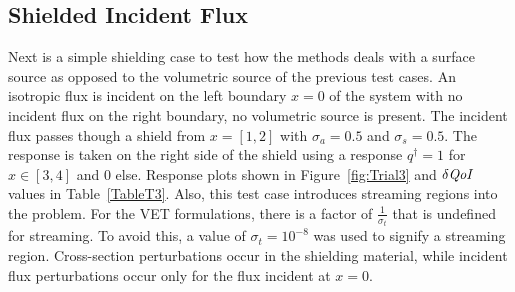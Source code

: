 \documentclass[12pt]{report}
\newcommand{\sigt}{\sigma_t}
\newcommand{\sigs}{\sigma_s}
\newcommand{\siga}{\sigma_a}
\newcommand{\qoi}{{\it QoI}\xspace}
\begin{document}
\subsection{Shielded Incident Flux}

Next is a simple shielding case to test how the methods deals with a surface source as opposed to the volumetric source of the previous test cases. An isotropic flux is incident on the left boundary $x=0$ of the system with no incident flux on the right boundary, no volumetric source is present. The incident flux passes though a shield from $x=[1,2]$ with $\siga=0.5$ and $\sigs=0.5$. The response is taken on the right side of the shield using a response $q^\dag=1$ for $x \in [3,4]$ and $0$ else. Response plots shown in Figure~\ref{fig:Trial3} and $\delta \qoi$ values in Table~\ref{TableT3}. Also, this test case introduces streaming regions into the problem. For the VET formulations, there is a factor of $\frac{1}{\sigt}$ that is undefined for streaming. To avoid this, a value of $\sigt=10^{-8}$ was used to signify a streaming region. Cross-section perturbations occur in the shielding material, while incident flux perturbations occur only for the flux incident at $x=0$.
\end{document}
